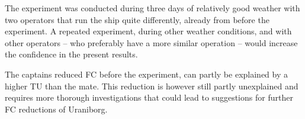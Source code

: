 The experiment was conducted during three days of relatively good weather with two operators that run the ship quite differently, already from before the experiment.
A repeated experiment, during other weather conditions, and with other operators --   who preferably have a more similar operation -- would increase the confidence in the present results.

The captains reduced FC before the experiment, can partly be explained by a higher TU  than the mate. %
This reduction is however still partly unexplained and requires more thorough investigations that could lead to suggestions for further FC reductions of Uraniborg.